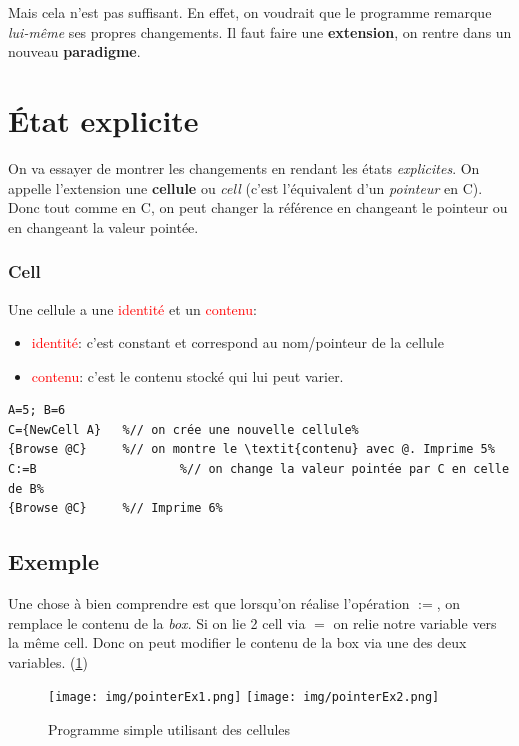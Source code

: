 \documentclass{report}
\begin{document}
Mais cela n'est pas suffisant. En effet, on voudrait que le programme remarque \textit{lui-même} ses propres changements. Il faut faire une \textbf{extension}, on rentre dans un nouveau \textbf{paradigme}.

\section{État explicite}
On va essayer de montrer les changements en rendant les états \textit{explicites}. On appelle l'extension une \textbf{cellule} ou \textit{cell} (c'est l'équivalent d'un \textit{pointeur} en C).\\
Donc tout comme en C, on peut changer la référence en changeant le pointeur ou en changeant la valeur pointée.

\subsubsection{Cell}
Une cellule a une \textcolor{red}{identité} et un \textcolor{red}{contenu}:

\begin{itemize}
\item \textcolor{red}{identité}: c'est constant et correspond au nom/pointeur de la cellule 
\item \textcolor{red}{contenu}: c'est le contenu stocké qui lui peut varier.
\end{itemize}

\begin{lstlisting}[escapechar=\%]
A=5; B=6
C={NewCell A}	%// on crée une nouvelle cellule%
{Browse @C}		%// on montre le \textit{contenu} avec @. Imprime 5%
C:=B					%// on change la valeur pointée par C en celle de B%
{Browse @C}		%// Imprime 6%
\end{lstlisting}

\subsection{Exemple}
Une chose à bien comprendre est que lorsqu'on réalise l'opération $:=$, on remplace le contenu de la \textit{box}. Si on lie 2 cell via $=$ on relie notre variable vers la même cell. Donc on peut modifier le contenu de la box via une des deux variables. (\ref{pointerEx1})
\begin{figure}[H]
\centering
\texttt{[image: img/pointerEx1.png]}
\texttt{[image: img/pointerEx2.png]}
\caption{Programme simple utilisant des cellules}
\label{pointerEx1}
\end{figure}
\end{document}
